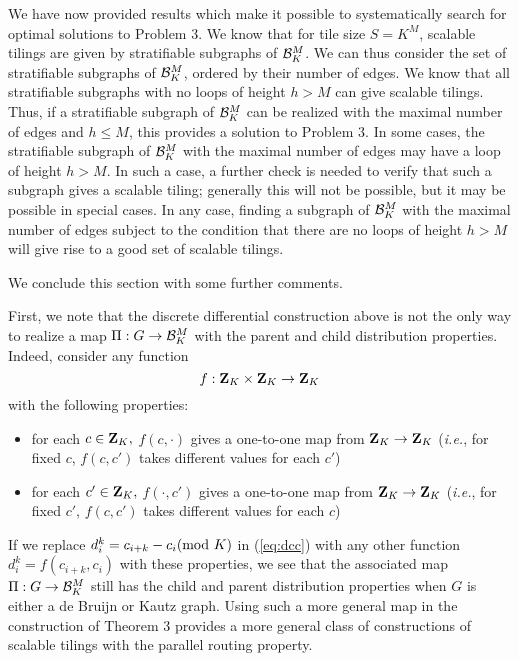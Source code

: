 \documentclass[12pt]{article}
\def\dk{{\cal B}_K}
\begin{document}
We have now provided results which make it possible to systematically
search for optimal solutions to Problem 3.  We know that for tile size
$S = K^M$, scalable tilings are given by stratifiable subgraphs of
$\dk^M$.  We can thus consider the set of stratifiable subgraphs of
$\dk^M$, ordered by their number of edges.  We know that all
stratifiable subgraphs with no loops of height $h > M$ can give
scalable tilings.  Thus, if a stratifiable subgraph of $\dk^M$ can be
realized with the maximal number of edges and $h \leq M$, this
provides a solution to Problem 3.  In some cases, the stratifiable
subgraph of $\dk^M$ with the maximal number of edges may have a loop
of height $h > M$.  In such a case, a further check is needed to
verify that such a subgraph gives a scalable tiling; generally this
will not be possible, but it may be possible in special cases.  In any
case, finding a subgraph of $\dk^M$ with the maximal number of edges
subject to the condition that there are no loops of height $h > M$
will give rise to a good set of scalable tilings.

We conclude this section with some further comments.

First, we note that the discrete differential construction above is
not the only way to realize a map $\Pi:G \rightarrow {\cal B}_K^M$ 
with the parent and child distribution properties.  Indeed,
consider any function 
\begin{equation}
f: {\bf Z}_K \times {\bf Z}_K \rightarrow {\bf Z}_K
\label{eq:f}
\end{equation}
with the following properties:
\begin{itemize}
\item  for each $c \in {\bf Z}_K,$ $f (c, \cdot)$ gives a one-to-one
  map from ${\bf Z}_K \rightarrow{\bf Z}_K$ ({\it i.e.}, for fixed
  $c$, $f (c, c')$ takes different values for each $c'$)
\item  for each $c' \in {\bf Z}_K,$ $f ( \cdot, c')$ gives a one-to-one
  map from ${\bf Z}_K \rightarrow{\bf Z}_K$ ({\it i.e.}, for fixed
  $c'$, $f (c, c')$ takes different values for each $c$)
\end{itemize}

If we replace $d^k_i = c_{i+ k}-c_i ({\rm mod}\ K)$ in (\ref{eq:dcc})
with any other function $d^k_i =f (c_{i + k}, c_i)$ with these
properties, we see that the associated map $\Pi:G \rightarrow {\cal
B}_K^M$ still has the child and parent distribution properties when
$G$ is either a de Bruijn or Kautz graph.  Using such a more general
map in the construction of Theorem 3 provides a more general class of
constructions of scalable tilings with the parallel routing property.
\end{document}
